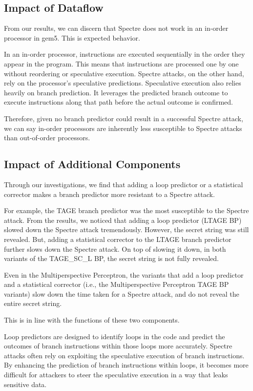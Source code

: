 \documentclass[twocolumn,showpacs,%
  nofootinbib,aps,superscriptaddress,%
  eqsecnum,prd,notitlepage,showkeys,10pt]{revtex4-1}
\begin{document}
\subsection{Impact of Dataflow}
From our results, we can discern that Spectre does not work in an in-order processor in gem5. This is expected behavior.

In an in-order processor, instructions are executed sequentially in the order they appear in the program. This means that instructions are processed one by one without reordering or speculative execution. Spectre attacks, on the other hand, rely on the processor's speculative predictions. Speculative execution also relies heavily on branch prediction. It leverages the predicted branch outcome to execute instructions along that path before the actual outcome is confirmed.

Therefore, given no branch predictor could result in a successful Spectre attack, we can say in-order processors are inherently less susceptible to Spectre attacks than out-of-order processors.

\subsection{Impact of Additional Components}
Through our investigations, we find that adding a loop predictor or a statistical corrector makes a branch predictor more resistant to a Spectre attack.

For example, the TAGE branch predictor was the most susceptible to the Spectre attack. From the results, we noticed that adding a loop predictor (LTAGE BP) slowed down the Spectre attack tremendously. However, the secret string was still revealed. But, adding a statistical corrector to the LTAGE branch predictor further slows down the Spectre attack. On top of slowing it down, in both variants of the TAGE\_SC\_L BP, the secret string is not fully revealed.

Even in the Multiperspective Perceptron, the variants that add a loop predictor and a statistical corrector (i.e., the Multiperspective Perceptron TAGE BP variants) slow down the time taken for a Spectre attack, and do not reveal the entire secret string.

This is in line with the functions of these two components.

Loop predictors are designed to identify loops in the code and predict the outcomes of branch instructions within those loops more accurately. Spectre attacks often rely on exploiting the speculative execution of branch instructions. By enhancing the prediction of branch instructions within loops, it becomes more difficult for attackers to steer the speculative execution in a way that leaks sensitive data.
\end{document}
